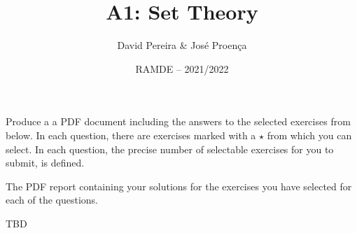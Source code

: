 \documentclass[11pt]{article}
\date{RAMDE -- 2021/2022}
\begin{document}
 
 
\title{A1: Set Theory}%

\author{David Pereira \& Jos\'{e} Proen\c{c}a} 


\maketitle

\vspace*{-5mm}
 Produce a a PDF document including the answers to the selected exercises from below. In each question, there are exercises marked with a $\star$ from which you can select. In each question, the precise number of selectable exercises for you to submit, is defined.

 The PDF report containing your solutions for the exercises you have selected for each of the questions. 

 TBD %

\end{document}

